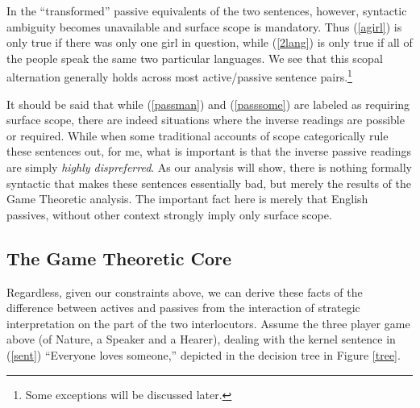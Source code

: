 \documentclass{article}
\begin{document}
In the ``transformed'' passive equivalents of the two sentences, however, syntactic ambiguity becomes unavailable and surface scope is mandatory.
Thus (\ref{agirl}) is only true if there was only one girl in question, while (\ref{2lang}) is only true if all of the people speak the same two particular languages.
We see that this scopal alternation generally holds across most active/passive sentence pairs.\footnote{Some exceptions will be discussed later.}

\begin{exe}
\end{exe}

It should be said that while (\ref{passman}) and (\ref{passsome}) are labeled as requiring surface scope, there are indeed situations where the inverse readings are possible or required.
While when some traditional accounts of scope categorically rule these sentences out, for me, what is important is that the inverse passive readings are simply \emph{highly dispreferred}.
As our analysis will show, there is nothing formally syntactic that makes these sentences essentially bad, but merely the results of the Game Theoretic analysis.
The important fact here is merely that English passives, without other context strongly imply only surface scope.

\subsection{The Game Theoretic Core}

Regardless, given our constraints above, we can derive these facts of the difference between actives and passives from the interaction of strategic interpretation on the part of the two interlocutors.
Assume the three player game above (of Nature, a Speaker and a Hearer), dealing with the kernel sentence in (\ref{sent}) ``Everyone loves someone,'' depicted in the decision tree in Figure \ref{tree}.
\end{document}
